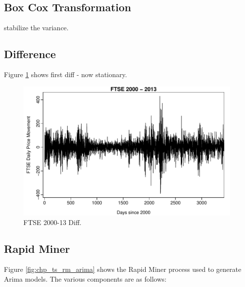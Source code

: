 \subsection{Box Cox Transformation}
stabilize the variance.

\subsection{Difference}

Figure \ref{fig:chp_ts_ftse_2000_13_diff} shows first diff - now stationary.

\begin{figure}[tbh]
\centering
\includegraphics{Figures/chp_ts_ftse_2000-13_diff}
\caption[FTSE 2000-13 Diff.]{FTSE 2000-13 Diff.}
\label{fig:chp_ts_ftse_2000_13_diff}
\end{figure}

\subsection{Rapid Miner}
Figure \ref{fig:chp_ts_rm_arima} shows the Rapid Miner process used to generate Arima models. The various components are as follows:

